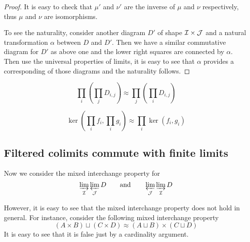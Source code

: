 \begin{proof}
  It is easy to check that $\mu'$ and $\nu'$ are the inverse of $\mu$ and $\nu$ respectively, thus $\mu$ and $\nu$ are isomorphisms.

  To see the naturality, consider another diagram $D'$ of shape ${\cal I}\times{\cal J}$ and a natural transformation $\alpha$ between $D$ and $D'$. Then we have a similar commutative diagram for $D'$ as above one and the lower right squares are connected by $\alpha$. Then use the universal properties of limits, it is easy to see that $\alpha$ provides a corresponding of those diagrams and the naturality follows.
  \end{proof}
  \begin{exam}
    \begin{equation*}
      \prod_{i}(\prod_{j} D_{i,j}) \approx \prod_{j}(\prod_{i} D_{i,j})
    \end{equation*}
  \end{exam}
  \begin{exam}
    \begin{equation*}
      \ker(\prod_i f_i,\prod_i g_i) \approx \prod_i \ker(f_i,g_i)
    \end{equation*}
  \end{exam}

\subsection{Filtered colimits commute with finite limits}
  Now we consider the mixed interchange property for
  \begin{equation*}
    \operatorname*{\underrightarrow{\lim}}_{{\cal I}}\operatorname*{\underleftarrow{\lim}}_{{\cal J}} D \qquad\text{and}\qquad \operatorname*{\underleftarrow{\lim}}_{{\cal J}}\operatorname*{\underrightarrow{\lim}}_{{\cal I}} D
  \end{equation*}

  However, it is easy to see that the mixed interchange property does not hold in general. For instance, consider the following mixed interchange property
  \begin{equation*}
    (A\times B)\sqcup(C\times D)\approx(A\sqcup B)\times(C\sqcup D)
  \end{equation*}
  It is easy to see that it is false just by a cardinality argument.

